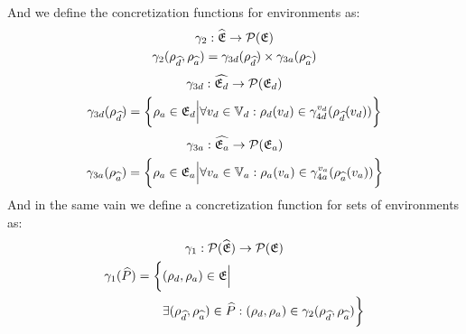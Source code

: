 And we define the concretization functions for environments as:
\begin{gather}
    \gamma_2 : \widehat{\mathfrak{E}} \rightarrow \mathcal{P}(\mathfrak{E})\\
    \gamma_2(\rho_{\widehat{d}}, \rho_{\widehat{a}}) = \gamma_{3d}(\rho_{\widehat{d}}) \times \gamma_{3a}(\rho_{\widehat{a}})
\end{gather}
\begin{gather}
    \gamma_{3d} : \widehat{\mathfrak{E}_d} \rightarrow \mathcal{P}(\mathfrak{E}_d)\\
    \gamma_{3d}(\rho_{\widehat{d}}) = \biggl\{ \rho_{a} \in \mathfrak{E}_d \Big| \forall v_d \in \mathbb{V}_d : \rho_d(v_d) \in \gamma^{v_d}_{4d}(\rho_{\widehat{d}}(v_d)) \biggr\}
\end{gather}
\begin{gather}
    \gamma_{3a} : \widehat{\mathfrak{E}_a} \rightarrow \mathcal{P}(\mathfrak{E}_a)\\
    \gamma_{3a}(\rho_{\widehat{a}}) = \biggl\{ \rho_{a} \in \mathfrak{E}_a \Big| \forall v_a \in \mathbb{V}_a : \rho_a(v_a) \in \gamma^{v_a}_{4a}(\rho_{\widehat{a}}(v_a)) \biggr\}
\end{gather}
And in the same vain we define a concretization function for sets of environments as:
\begin{gather}
    \gamma_1 : \mathcal{P}(\widehat{\mathfrak{E}}) \rightarrow \mathcal{P}(\mathfrak{E})\\
    \begin{split}
        \gamma_1(\widehat{P}) = \biggl\{ &(\rho_{d}, \rho_{a}) \in \mathfrak{E} \Big|\\
        &\exists (\rho_{\widehat{d}}, \rho_{\widehat{a}}) \in \widehat{P} : (\rho_{d}, \rho_{a}) \in \gamma_2(\rho_{\widehat{d}}, \rho_{\widehat{a}})\biggr\}
    \end{split}
\end{gather}

